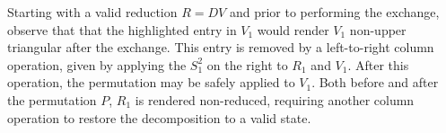 \documentclass[sn-mathphys]{sn-jnl}
\newcommand\topstrut[1][1.0ex]{\setlength\bigstrutjot{#1}{\bigstrut[t]}}
\newcommand\botstrut[1][0.9ex]{\setlength\bigstrutjot{#1}{\bigstrut[b]}}
\begin{document}
Starting with a valid reduction $R = DV$ and prior to performing the exchange, observe that that the highlighted entry in $V_1$ would render $V_1$ non-upper triangular after the exchange. This entry is removed by a left-to-right column operation, given by applying the $S_1^{2}$ on the right to $R_1$ and $V_1$. After this operation, the permutation may be safely applied to $V_1$. Both before and after the permutation $P$, $R_1$ is rendered non-reduced, requiring another column operation to restore the decomposition to a valid state.
\end{document}
